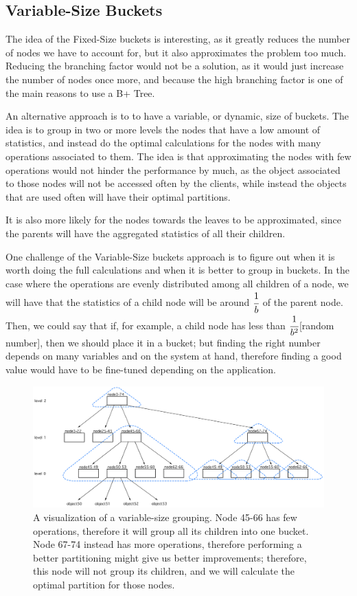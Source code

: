 \subsection{Variable-Size Buckets}\label{sec:Variable-Size buckets}
The idea of the Fixed-Size buckets is interesting, as it greatly reduces the number of nodes we have to account for, but it also approximates the problem too much. Reducing the branching factor would not be a solution, as it would just increase the number of nodes once more, and because the high branching factor is one of the main reasons to use a B+ Tree. 

An alternative approach is to to have a variable, or dynamic, size of buckets. The idea is to group in two or more levels the nodes that have a low amount of statistics, and instead do the optimal calculations for the nodes with many operations associated to them. The idea is that approximating the nodes with few operations would not hinder the performance by much, as the object associated to those nodes will not be accessed often by the clients, while instead the objects that are used often will have their optimal partitions.

It is also more likely for the nodes towards the leaves to be approximated, since the parents will have the aggregated statistics of all their children.

One challenge of the Variable-Size buckets approach is to figure out when it is worth doing the full calculations and when it is better to group in buckets. In the case where the operations are evenly distributed among all children of a node, we will have that the statistics of a child node will be around $\cfrac{1}{b}$ of the parent node. Then, we could say that if, for example, a child node has less than $\cfrac{1}{b^2}$[random number], then we should place it in a bucket; but finding the right number depends on many variables and on the system at hand, therefore finding a good value would have to be fine-tuned depending on the application.

\begin{figure}[!htb]
  \centering
  \includegraphics[width=\textwidth,height=\textheight,keepaspectratio]{img/dynamic-buckets.png}
  \caption[caption]{ A visualization of a variable-size grouping. Node 45-66 has few operations, therefore it will group all its children into one bucket. Node 67-74 instead has more operations, therefore performing a better partitioning might give us better improvements; therefore, this node will not group its children, and we will calculate the optimal partition for those nodes. }
  \label{fig:Variable-Size-buckets}
\end{figure}

